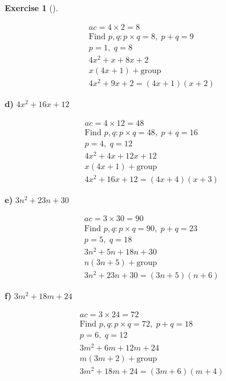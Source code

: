 \documentclass[
  letterpaper,
  DIV=11,
  numbers=noendperiod]{scrreprt}
\theoremstyle{definition}
\newtheorem{exercise}{Exercise}[chapter]
\theoremstyle{remark}
\begin{document}
\begin{exercise}[]
\begin{tcolorbox}
\begin{align*}
ac = 4 \times 2 = 8 \\ \text{Find } p, q: p \times q = 8,\; p + q = 9 \\ p = 1,\; q = 8 \\ 4x^2 + x + 8x + 2 \\ x(4x + 1) + \text{group} \\ 4x^2 + 9x + 2 = (4x + 1)(x + 2)
\end{align*}

\textbf{d)} \(\displaystyle 4x^2 + 16x + 12\)

\begin{align*}
ac = 4 \times 12 = 48 \\ \text{Find } p, q: p \times q = 48,\; p + q = 16 \\ p = 4,\; q = 12 \\ 4x^2 + 4x + 12x + 12 \\ x(4x + 1) + \text{group} \\ 4x^2 + 16x + 12 = (4x + 4)(x + 3)
\end{align*}

\textbf{e)} \(\displaystyle 3n^2 + 23n + 30\)

\begin{align*}
ac = 3 \times 30 = 90 \\ \text{Find } p, q: p \times q = 90,\; p + q = 23 \\ p = 5,\; q = 18 \\ 3n^2 + 5n + 18n + 30 \\ n(3n + 5) + \text{group} \\ 3n^2 + 23n + 30 = (3n + 5)(n + 6)
\end{align*}

\textbf{f)} \(\displaystyle 3m^2 + 18m + 24\)

\begin{align*}
ac = 3 \times 24 = 72 \\ \text{Find } p, q: p \times q = 72,\; p + q = 18 \\ p = 6,\; q = 12 \\ 3m^2 + 6m + 12m + 24 \\ m(3m + 2) + \text{group} \\ 3m^2 + 18m + 24 = (3m + 6)(m + 4)
\end{align*}

\end{tcolorbox}

\end{exercise}
\end{document}
